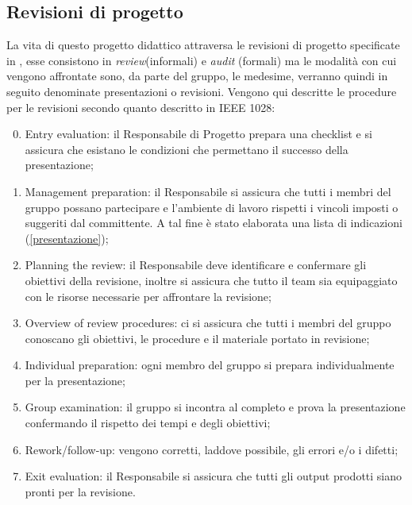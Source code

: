 \subsection{Revisioni di progetto}
La vita di questo progetto didattico attraversa le revisioni di progetto specificate in \PianoDiProgetto{}, esse consistono in \emph{review}(informali) e \emph{audit} (formali) ma le modalità con cui vengono affrontate sono, da parte del gruppo, le medesime, verranno quindi in seguito denominate presentazioni o revisioni. Vengono qui descritte le procedure per le revisioni secondo quanto descritto in IEEE 1028:
\begin{enumerate}
	\setcounter{enumi}{-1}
	\item Entry evaluation: il Responsabile di Progetto prepara una checklist e si assicura che esistano le condizioni che permettano il successo della presentazione;
	\item Management preparation: il Responsabile si assicura che tutti i membri del gruppo possano partecipare e l'ambiente di lavoro rispetti i vincoli imposti o suggeriti dal committente. A tal fine è stato elaborata una lista di indicazioni (\ref{presentazione});
	\item Planning the review: il Responsabile deve identificare e confermare gli obiettivi della revisione, inoltre si assicura che tutto il team sia equipaggiato con le risorse necessarie per affrontare la revisione;
	\item Overview of review procedures: ci si assicura che tutti i membri del gruppo conoscano gli obiettivi, le procedure e il materiale portato in revisione;
	\item Individual preparation: ogni membro del gruppo si prepara individualmente per la presentazione;
	\item Group examination: il gruppo si incontra al completo e prova la presentazione confermando il rispetto dei tempi e degli obiettivi;
	\item Rework/follow-up: vengono corretti, laddove possibile,  gli errori e/o i difetti;
	\item Exit evaluation: il Responsabile si assicura che tutti gli output prodotti siano pronti per la revisione.
\end{enumerate}

